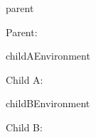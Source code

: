 \documentclass[12pt]{pnpprep}
\begin{document}
\begin{blueprint}{parent}


    \begin{render}
        Parent: \namevalue
        \par

        \renderChildren
    \end{render}
\end{blueprint}


\begin{blueprint}{childAEnvironment}

    \begin{render}
        Child A: \namevalue
        \par
    \end{render}
\end{blueprint}


\begin{blueprint}{childBEnvironment}

    \begin{render}
        Child B: \namevalue
        \par
    \end{render}
\end{blueprint}


\begin{parent}

    \begin{childA}
    \end{childA}

    \begin{childB}
    \end{childB}

\end{parent}
\end{document}
